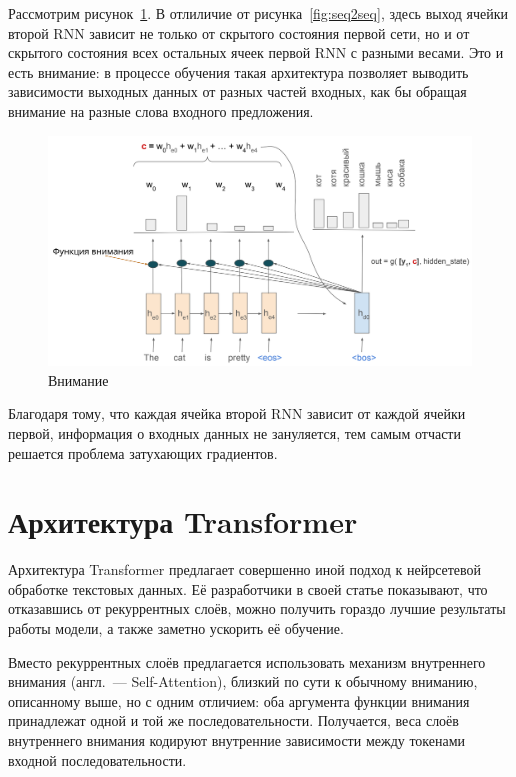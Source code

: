Рассмотрим рисунок \ref*{fig:attention}. В отлиличие от рисунка \ref*{fig:seq2seq}, здесь выход ячейки второй RNN зависит не только от скрытого состояния первой сети, но и от скрытого состояния всех остальных ячеек первой RNN с разными весами. Это и есть внимание: в процессе обучения такая архитектура позволяет выводить зависимости выходных данных от разных частей входных, как бы обращая внимание на разные слова входного предложения.

\begin{figure}[h]
    \centering
    \includegraphics[width=\textwidth]{../inc/images/attention.png}
    \caption{Внимание}
    \label{fig:attention}
\end{figure}

Благодаря тому, что каждая ячейка второй RNN зависит от каждой ячейки первой, информация о входных данных не зануляется, тем самым отчасти решается проблема затухающих градиентов.

\section{Архитектура Transformer}

Архитектура Transformer предлагает совершенно иной подход к нейрсетевой обработке текстовых данных. Её разработчики в своей статье \cite{art:transformer} показывают, что отказавшись от рекуррентных слоёв, можно получить гораздо лучшие результаты работы модели, а также заметно ускорить её обучение.

Вместо рекуррентных слоёв предлагается использовать механизм внутреннего внимания (англ. --- Self-Attention), близкий по сути к обычному вниманию, описанному выше, но с одним отличием: оба аргумента функции внимания принадлежат одной и той же последовательности. Получается, веса слоёв внутреннего внимания кодируют внутренние зависимости между токенами входной последовательности.

